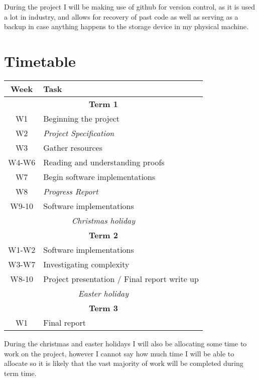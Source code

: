 \documentclass[12pt, a4paper]{article}
\begin{document}
During the project I will be making use of github for version control, as it is used a lot in industry, and allows for recovery of past code as well as serving as a backup in case anything happens to the storage device in my physical machine.

\section{Timetable}

\begin{center}
    \begin{tabular}{| c | p{8cm} |}
        \hline
        \textbf{Week} & \textbf{Task} \\
        \hline
        \multicolumn{2}{|c|}{\textbf{Term 1}} \\
        \hline
        W1 & Beginning the project \\
        W2 & \textit{Project Specification} \\
        W3 & Gather resources \\
        W4-W6 & Reading and understanding proofs \\
        W7 & Begin software implementations \\
        W8 & \textit{Progress Report} \\
        W9-10 & Software implementations \\
        \hline
        \multicolumn{2}{|c|}{\textit{Christmas holiday}}\\
        \hline
        \multicolumn{2}{|c|}{\textbf{Term 2}} \\
        \hline
        W1-W2 & Software implementations \\
        W3-W7 & Investigating complexity \\
        W8-10 & Project presentation / Final report write up \\
        \hline
        \multicolumn{2}{|c|}{\textit{Easter holiday}}\\
        \hline
        \multicolumn{2}{|c|}{\textbf{Term 3}}\\
        \hline
        W1 & Final report\\
        \hline
    \end{tabular}
\end{center}
During the christmas and easter holidays I will also be allocating some time to work on the project, however I cannot say how much time I will be able to allocate so it is likely that the vast majority of work will be completed during term time.
\end{document}
